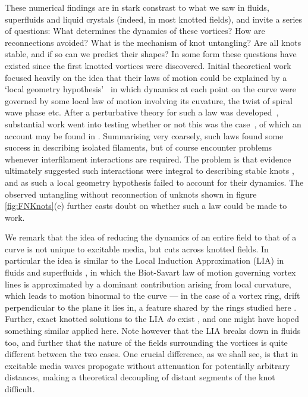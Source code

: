 These numerical findings are in stark constrast to what we saw in fluids, superfluids and liquid crystals (indeed, in most knotted fields), and invite a series of questions: What determines the dynamics of these vortices? How are reconnections avoided? What is the mechanism of knot untangling? Are all knots stable, and if so can we predict their shapes? In some form these questions have existed since the first knotted vortices were discovered. Initial theoretical work focused heavily on the idea that their laws of motion could be explained by a `local geometry hypothesis'~\citep{Keener1988,Keener1992,Henry2002,Biktashev1994,Echebarria2006,Dierckx2010} in which dynamics at each point on the curve were governed by some local law of motion involving its cuvature, the twist of spiral wave phase etc. After a perturbative theory for such a law was developed~\citep{Keener1988,Keener1992, Biktashev1994}, substantial work went into testing whether or not this was the case~\citep{Henze1993,Winfree1990}, of which an account may be found in \citep{WinfreeChapter}. Summarising very coarsely, such laws found some success in describing isolated filaments, but of course encounter problems whenever interfilament interactions are required. The problem is that evidence ultimately suggested such interactions were integral to describing stable knots \citep{Henze1993,WinfreeChapter}, and as such a local geometry hypothesis failed to account for their dynamics. The observed untangling without reconnection of unknots shown in figure \ref{fig:FNKnots}(e) \citep{Maucher2016} further casts doubt on whether such a law could be made to work. 

We remark that the idea of reducing the dynamics of an entire field to that of a curve is not unique to excitable media, but cuts across knotted fields. In particular the idea is similar to the Local Induction Approximation (LIA) in fluids and superfluids \citep{Saffman1992}, in which the Biot-Savart law of motion governing vortex lines is approximated by a dominant contribution arising from local curvature, which leads to motion binormal to the curve --- in the case of a vortex ring, drift perpendicular to the plane it lies in, a feature shared by the rings studied here \citep{Winfree1990}. Further, exact knotted solutions to the LIA \emph{do} exist \citep{Kida1981,Hasimoto1972}, and one might have hoped something similar applied here. Note however that the LIA breaks down in fluids too, and further that the nature of the fields surrounding the vortices is quite different between the two cases. One crucial difference, as we shall see, is that in excitable media waves propogate without attenuation for potentially arbitrary distances, making a theoretical decoupling of distant segments of the knot difficult.     

